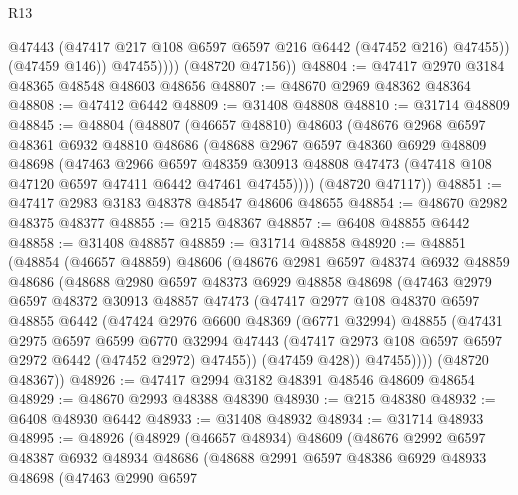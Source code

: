 \begin{lexlean}{R13}
\begin{coremodule}
                  @47443
                  (@47417 @217 @108 @6597 @6597 @216 @6442 (@47452 @216) @47455))
                (@47459 @146))
              @47455))))
      (@48720 @47156))
@48804 := @47417 @2970 @3184 @48365 @48548 @48603 @48656
@48807 := @48670 @2969 @48362 @48364
@48808 := @47412 @6442
@48809 := @31408 @48808
@48810 := @31714 @48809
@48845 := @48804
    (@48807
      (@46657 @48810)
      @48603
      (@48676
        @2968
        @6597
        @48361
        @6932
        @48810
        @48686
        (@48688
          @2967
          @6597
          @48360
          @6929
          @48809
          @48698
          (@47463
            @2966
            @6597
            @48359
            @30913
            @48808
            @47473
            (@47418 @108 @47120 @6597 @47411 @6442 @47461 @47455))))
      (@48720 @47117))
@48851 := @47417 @2983 @3183 @48378 @48547 @48606 @48655
@48854 := @48670 @2982 @48375 @48377
@48855 := @215 @48367
@48857 := @6408 @48855 @6442
@48858 := @31408 @48857
@48859 := @31714 @48858
@48920 := @48851
    (@48854
      (@46657 @48859)
      @48606
      (@48676
        @2981
        @6597
        @48374
        @6932
        @48859
        @48686
        (@48688
          @2980
          @6597
          @48373
          @6929
          @48858
          @48698
          (@47463
            @2979
            @6597
            @48372
            @30913
            @48857
            @47473
            (@47417
              @2977
              @108
              @48370
              @6597
              @48855
              @6442
              (@47424
                @2976
                @6600
                @48369
                (@6771 @32994)
                @48855
                (@47431
                  @2975
                  @6597
                  @6599
                  @6770
                  @32994
                  @47443
                  (@47417 @2973 @108 @6597 @6597 @2972 @6442 (@47452 @2972) @47455))
                (@47459 @428))
              @47455))))
      (@48720 @48367))
@48926 := @47417 @2994 @3182 @48391 @48546 @48609 @48654
@48929 := @48670 @2993 @48388 @48390
@48930 := @215 @48380
@48932 := @6408 @48930 @6442
@48933 := @31408 @48932
@48934 := @31714 @48933
@48995 := @48926
    (@48929
      (@46657 @48934)
      @48609
      (@48676
        @2992
        @6597
        @48387
        @6932
        @48934
        @48686
        (@48688
          @2991
          @6597
          @48386
          @6929
          @48933
          @48698
          (@47463
            @2990
            @6597

\end{coremodule}
\end{lexlean}
